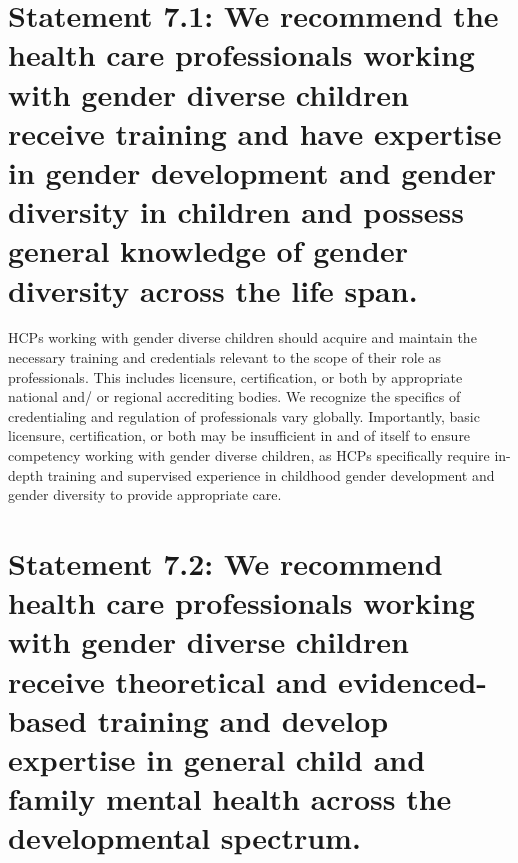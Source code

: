 \documentclass[
]{book}
\begin{document}
\hypertarget{statement-7.1-we-recommend-the-health-care-professionals-working-with-gender-diverse-children-receive-training-and-have-expertise-in-gender-development-and-gender-diversity-in-children-and-possess-general-knowledge-of-gender-diversity-across-the-life-span.}{%
\section*{Statement 7.1: We recommend the health care professionals working with gender diverse children receive training and have expertise in gender development and gender diversity in children and possess general knowledge of gender diversity across the life span.}\label{statement-7.1-we-recommend-the-health-care-professionals-working-with-gender-diverse-children-receive-training-and-have-expertise-in-gender-development-and-gender-diversity-in-children-and-possess-general-knowledge-of-gender-diversity-across-the-life-span.}}

HCPs working with gender diverse children
should acquire and maintain the necessary training and credentials relevant to the scope of their
role as professionals. This includes licensure, certification, or both by appropriate national and/
or regional accrediting bodies. We recognize the
specifics of credentialing and regulation of professionals vary globally. Importantly, basic licensure, certification, or both may be insufficient in
and of itself to ensure competency working with
gender diverse children, as HCPs specifically
require in-depth training and supervised experience in childhood gender development and gender diversity to provide appropriate care.

\hypertarget{statement-7.2-we-recommend-health-care-professionals-working-with-gender-diverse-children-receive-theoretical-and-evidenced-based-training-and-develop-expertise-in-general-child-and-family-mental-health-across-the-developmental-spectrum.}{%
\section*{Statement 7.2: We recommend health care professionals working with gender diverse children receive theoretical and evidenced-based training and develop expertise in general child and family mental health across the developmental spectrum.}\label{statement-7.2-we-recommend-health-care-professionals-working-with-gender-diverse-children-receive-theoretical-and-evidenced-based-training-and-develop-expertise-in-general-child-and-family-mental-health-across-the-developmental-spectrum.}}
\end{document}
